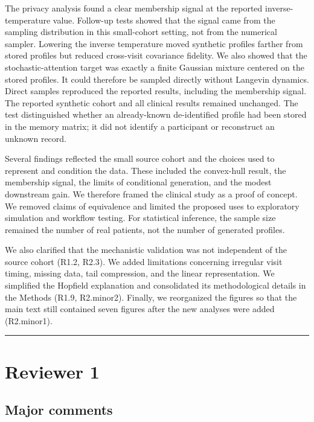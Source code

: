 \documentclass[
  11pt,
  letterpaper,
]{article}
\begin{document}
The privacy analysis found a clear membership signal at the reported inverse-temperature value. Follow-up tests showed that the signal came from the sampling distribution in this small-cohort setting, not from the numerical sampler. Lowering the inverse temperature moved synthetic profiles farther from stored profiles but reduced cross-visit covariance fidelity. We also showed that the stochastic-attention target was exactly a finite Gaussian mixture centered on the stored profiles. It could therefore be sampled directly without Langevin dynamics. Direct samples reproduced the reported results, including the membership signal. The reported synthetic cohort and all clinical results remained unchanged. The test distinguished whether an already-known de-identified profile had been stored in the memory matrix; it did not identify a participant or reconstruct an unknown record.

Several findings reflected the small source cohort and the choices used to represent and condition the data. These included the convex-hull result, the membership signal, the limits of conditional generation, and the modest downstream gain. We therefore framed the clinical study as a proof of concept. We removed claims of equivalence and limited the proposed uses to exploratory simulation and workflow testing. For statistical inference, the sample size remained the number of real patients, not the number of generated profiles.

We also clarified that the mechanistic validation was not independent of the source cohort (R1.2, R2.3). We added limitations concerning irregular visit timing, missing data, tail compression, and the linear representation. We simplified the Hopfield explanation and consolidated its methodological details in the Methods (R1.9, R2.minor2). Finally, we reorganized the figures so that the main text still contained seven figures after the new analyses were added (R2.minor1).

\begin{center}\rule{0.5\linewidth}{0.5pt}\end{center}

\section{Reviewer 1}\label{reviewer-1}

\subsection{Major comments}\label{major-comments}
\end{document}
